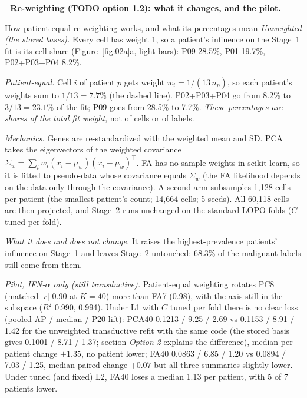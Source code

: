 \makeatletter
\providecommand{\softneedspace}[1]{\par\begingroup\dimen@ii\pagegoal\advance\dimen@ii-\pagetotal
  \ifdim #1>\dimen@ii\ifdim\dimen@ii>\z@\newpage\fi\fi\endgroup}
\makeatother
\softneedspace{12\baselineskip}
\textbf{Re-weighting (TODO option 1.2): what it changes, and the pilot.}

\begin{explainbox}{How patient-equal re-weighting works, and what its percentages mean}
\emph{Unweighted (the stored bases).} Every cell has weight 1, so a patient's influence on the Stage~1 fit is its cell share (Figure~\ref{fig:02a}a, light bars): P09 28.5\%, P01 19.7\%, P02+P03+P04 8.2\%.

\emph{Patient-equal.} Cell $i$ of patient $p$ gets weight $w_i = 1/(13\, n_p)$, so each patient's weights sum to $1/13 = 7.7\%$ (the dashed line). P02+P03+P04 go from 8.2\% to $3/13 = 23.1\%$ of the fit; P09 goes from 28.5\% to 7.7\%. \emph{These percentages are shares of the total fit weight}, not of cells or of labels.

\emph{Mechanics.} Genes are re-standardized with the weighted mean and SD. PCA takes the eigenvectors of the weighted covariance $\Sigma_w = \sum_i w_i (x_i - \mu_w)(x_i - \mu_w)^\top$. FA has no sample weights in scikit-learn, so it is fitted to pseudo-data whose covariance equals $\Sigma_w$ (the FA likelihood depends on the data only through the covariance). A second arm subsamples 1,128 cells per patient (the smallest patient's count; 14,664 cells; 5 seeds). All 60,118 cells are then projected, and Stage~2 runs unchanged on the standard LOPO folds ($C$ tuned per fold).

\emph{What it does and does not change.} It raises the highest-prevalence patients' influence on Stage~1 and leaves Stage~2 untouched: 68.3\% of the malignant labels still come from them.
\end{explainbox}

\emph{Pilot, IFN-$\alpha$ only (still transductive).} Patient-equal weighting rotates PC8 (matched $|r|$ 0.90 at $K = 40$) more than FA7 (0.98), with the axis still in the subspace ($R^2$ 0.990, 0.994). Under L1 with $C$ tuned per fold there is no clear loss (pooled AP / median / P20 lift): PCA40 0.1213 / 9.25 / 2.69\pp{} vs 0.1153 / 8.91 / 1.42\pp{} for the unweighted transductive refit with the same code (the stored basis gives 0.1001 / 8.71 / 1.37\pp; section \emph{Option 2} explains the difference), median per-patient change $+1.35$\pp, no patient lower; FA40 0.0863 / 6.85 / 1.20 vs 0.0894 / 7.03 / 1.25\pp, median paired change $+0.07$\pp{} but all three summaries slightly lower. Under tuned (and fixed) L2, FA40 loses a median 1.13\pp{} per patient, with 5 of 7 patients lower. 

